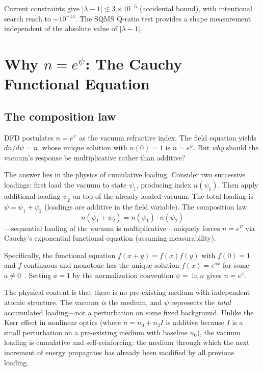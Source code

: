\documentclass[aps,prd,twocolumn,superscriptaddress,nofootinbib]{revtex4-2}
\begin{document}
Current constraints give
$|\lambda - 1| \lesssim 3 \times 10^{-5}$ (accidental bound),
with intentional search reach to $\sim 10^{-14}$.  The SQMS Q-ratio
test provides a shape measurement independent of the absolute value
of $|\lambda - 1|$.


\section{Why $n = e^\psi$: The Cauchy Functional Equation}
\label{sec:exponential}

\subsection{The composition law}

DFD postulates $n = e^\psi$ as the vacuum refractive index.  The
field equation yields $dn/d\psi = n$, whose unique solution with
$n(0) = 1$ is $n = e^\psi$.  But \emph{why} should the vacuum's
response be multiplicative rather than additive?

The answer lies in the physics of cumulative loading.  Consider two
successive loadings: first load the vacuum to state $\psi_1$,
producing index $n(\psi_1)$.  Then apply additional loading $\psi_2$
on top of the already-loaded vacuum.  The total loading is
$\psi = \psi_1 + \psi_2$ (loadings are additive in the field
variable).  The composition law
\begin{equation}
n(\psi_1 + \psi_2) = n(\psi_1) \cdot n(\psi_2)
\label{eq:composition}
\end{equation}
---sequential loading of the vacuum is multiplicative---uniquely
forces $n = e^\psi$ via Cauchy's exponential functional equation
(assuming measurability).

Specifically, the functional equation $f(x + y) = f(x)f(y)$ with
$f(0) = 1$ and $f$ continuous and monotone has the unique solution
$f(x) = e^{ax}$ for some $a \neq 0$~\cite{Kuczma2009}.  Setting
$a = 1$ by the normalization convention $\psi = \ln n$ gives
$n = e^\psi$.

The physical content is that there is no pre-existing medium with
independent atomic structure.  The vacuum \emph{is} the medium, and
$\psi$ represents the \emph{total} accumulated loading---not a
perturbation on some fixed background.  Unlike the Kerr effect in
nonlinear optics (where $n = n_0 + n_2 I$ is additive because $I$ is
a small perturbation on a pre-existing medium with baseline $n_0$),
the vacuum loading is cumulative and self-reinforcing: the medium
through which the next increment of energy propagates has already been
modified by all previous loading.
\end{document}

